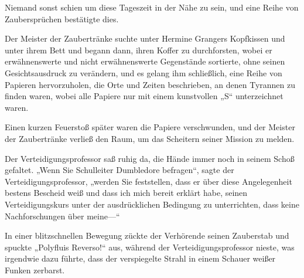 Niemand sonst schien um diese Tageszeit in der Nähe zu sein, und eine Reihe von Zaubersprüchen bestätigte dies.

Der Meister der Zaubertränke suchte unter Hermine Grangers Kopfkissen und unter ihrem Bett und begann dann, ihren Koffer zu durchforsten, wobei er erwähnenswerte und nicht erwähnenswerte Gegenstände sortierte, ohne seinen Gesichtsausdruck zu verändern, und es gelang ihm schließlich, eine Reihe von Papieren hervorzuholen, die Orte und Zeiten beschrieben, an denen Tyrannen zu finden waren, wobei alle Papiere nur mit einem kunstvollen „S“ unterzeichnet waren.

Einen kurzen Feuerstoß später waren die Papiere verschwunden, und der Meister der Zaubertränke verließ den Raum, um das Scheitern seiner Mission zu melden.

\later

Der Verteidigungsprofessor saß ruhig da, die Hände immer noch in seinem Schoß gefaltet. „Wenn Sie Schulleiter Dumbledore befragen“, sagte der Verteidigungsprofessor, „werden Sie feststellen, dass er über diese Angelegenheit bestens Bescheid weiß und dass ich mich bereit erklärt habe, seinen Verteidigungskurs unter der ausdrücklichen Bedingung zu unterrichten, dass keine Nachforschungen über meine—“

In einer blitzschnellen Bewegung zückte der Verhörende seinen Zauberstab und spuckte „Polyfluis Reverso!“ aus, während der Verteidigungsprofessor nieste, was irgendwie dazu führte, dass der verspiegelte Strahl in einem Schauer weißer Funken zerbarst.

